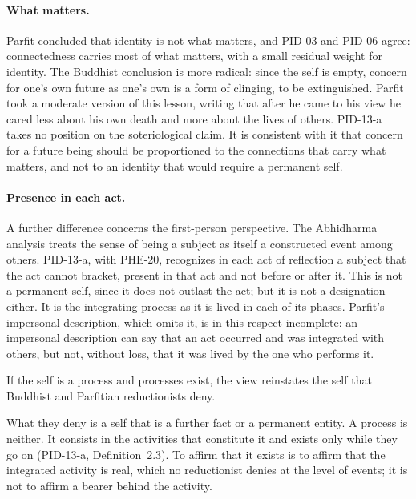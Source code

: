 \documentclass{situationist-preprint}
\begin{document}
\paragraph{What matters.} Parfit concluded that identity is not what matters, and PID-03 and PID-06 agree: connectedness carries most of what matters, with a small residual weight for identity. The Buddhist conclusion is more radical: since the self is empty, concern for one's own future as one's own is a form of clinging, to be extinguished. Parfit took a moderate version of this lesson, writing that after he came to his view he cared less about his own death and more about the lives of others. PID-13-a takes no position on the soteriological claim. It is consistent with it that concern for a future being should be proportioned to the connections that carry what matters, and not to an identity that would require a permanent self.

\paragraph{Presence in each act.} A further difference concerns the first-person perspective. The Abhidharma analysis treats the sense of being a subject as itself a constructed event among others. PID-13-a, with PHE-20, recognizes in each act of reflection a subject that the act cannot bracket, present in that act and not before or after it. This is not a permanent self, since it does not outlast the act; but it is not a designation either. It is the integrating process as it is lived in each of its phases. Parfit's impersonal description, which omits it, is in this respect incomplete: an impersonal description can say that an act occurred and was integrated with others, but not, without loss, that it was lived by the one who performs it.

\begin{objection}
If the self is a process and processes exist, the view reinstates the self that Buddhist and Parfitian reductionists deny.
\end{objection}

\begin{reply}
What they deny is a self that is a further fact or a permanent entity. A process is neither. It consists in the activities that constitute it and exists only while they go on (PID-13-a, Definition~2.3). To affirm that it exists is to affirm that the integrated activity is real, which no reductionist denies at the level of events; it is not to affirm a bearer behind the activity.
\end{reply}
\end{document}
